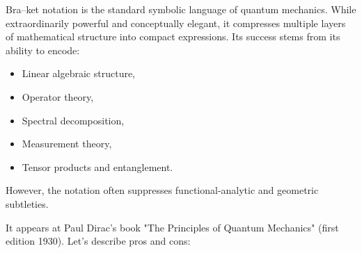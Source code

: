 Bra--ket notation is the standard symbolic language of quantum
mechanics. While extraordinarily powerful and conceptually elegant,
it compresses multiple layers of mathematical structure into compact
expressions. 
Its success stems from its ability to encode:
\begin{itemize}
\item Linear algebraic structure,
\item Operator theory,
\item Spectral decomposition,
\item Measurement theory,
\item Tensor products and entanglement.
\end{itemize}
However, the notation often suppresses functional-analytic and
geometric subtleties. 

It appears at Paul Dirac's book \cite{dirac-pqm}  "The Principles of Quantum Mechanics"
(first edition 1930). Let's describe pros and cons:
